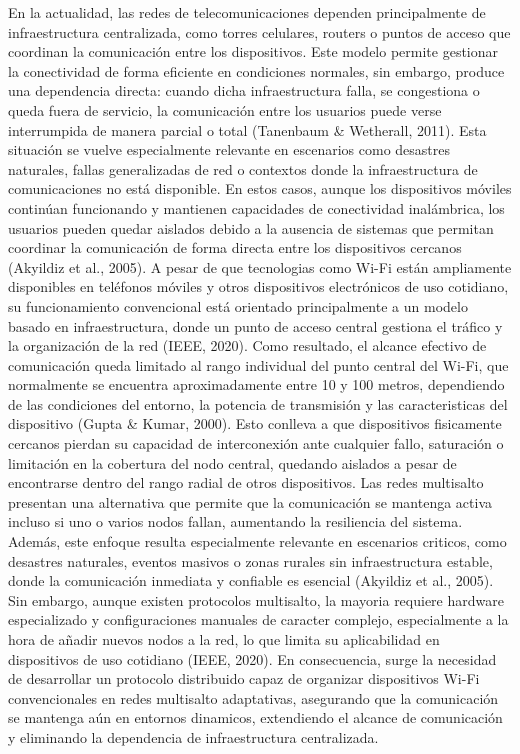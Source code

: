 En la actualidad, las redes de telecomunicaciones dependen principalmente de infraestructura centralizada, como torres celulares, routers o puntos de acceso que coordinan la comunicación entre los dispositivos. Este modelo permite gestionar la conectividad de forma eficiente en condiciones normales, sin embargo, produce una dependencia directa: cuando dicha infraestructura falla, se congestiona o queda fuera de servicio, la comunicación entre los usuarios puede verse interrumpida de manera parcial o total (Tanenbaum \& Wetherall, 2011). Esta situación se vuelve especialmente relevante en escenarios como desastres naturales, fallas generalizadas de red o contextos donde la infraestructura de comunicaciones no está disponible. En estos casos, aunque los dispositivos móviles continúan funcionando y mantienen capacidades de conectividad inalámbrica, los usuarios pueden quedar aislados debido a la ausencia de sistemas que permitan coordinar la comunicación de forma directa entre los dispositivos cercanos (Akyildiz et al., 2005). A pesar de que tecnologias como Wi-Fi están ampliamente disponibles en teléfonos móviles y otros dispositivos electrónicos de uso cotidiano, su funcionamiento convencional está orientado principalmente a un modelo basado en infraestructura, donde un punto de acceso central gestiona el tráfico y la organización de la red (IEEE, 2020). Como resultado, el alcance efectivo de comunicación queda limitado al rango individual del punto central del Wi-Fi, que normalmente se encuentra aproximadamente entre 10 y 100 metros, dependiendo de las condiciones del entorno, la potencia de transmisión y las caracteristicas del dispositivo (Gupta \& Kumar, 2000). Esto conlleva a que dispositivos fisicamente cercanos pierdan su capacidad de interconexión ante cualquier fallo, saturación o limitación en la cobertura del nodo central, quedando aislados a pesar de encontrarse dentro del rango radial de otros dispositivos. Las redes multisalto presentan una alternativa que permite que la comunicación se mantenga activa incluso si uno o varios nodos fallan, aumentando la resiliencia del sistema. Además, este enfoque resulta especialmente relevante en escenarios criticos, como desastres naturales, eventos masivos o zonas rurales sin infraestructura estable, donde la comunicación inmediata y confiable es esencial (Akyildiz et al., 2005). Sin embargo, aunque existen protocolos multisalto, la mayoria requiere hardware especializado y configuraciones manuales de caracter complejo, especialmente a la hora de añadir nuevos nodos a la red, lo que limita su aplicabilidad en dispositivos de uso cotidiano (IEEE, 2020). En consecuencia, surge la necesidad de desarrollar un protocolo distribuido capaz de organizar dispositivos Wi-Fi convencionales en redes multisalto adaptativas, asegurando que la comunicación se mantenga aún en entornos dinamicos, extendiendo el alcance de comunicación y eliminando la dependencia de infraestructura centralizada.

